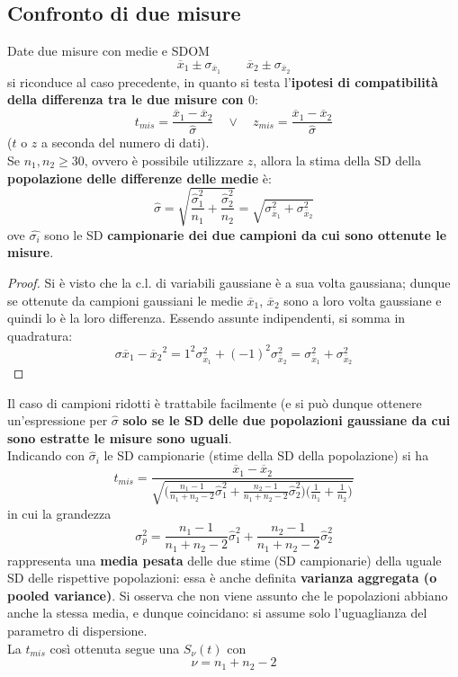 \documentclass[10pt, oneside]{book}
\begin{document}
\subsection{Confronto di due misure}
Date due misure con medie e SDOM
\[\overline{x}_1 \pm \sigma_{\overline{x}_1} \qquad \overline{x}_2 \pm \sigma_{\overline{x}_2}\]
si riconduce al caso precedente, in quanto si testa l'\textbf{ipotesi di compatibilità della differenza tra le due misure con $0$}:
\[t_{mis} = \frac{\overline{x}_1 - \overline{x}_2}{\hat{\sigma}} \quad \lor \quad z_{mis} = \frac{\overline{x}_1 - \overline{x}_2}{\hat{\sigma}}\]
($t$ o $z$ a seconda del numero di dati).\\
Se $n_1, n_2 \geq 30$, ovvero è possibile utilizzare $z$, allora la stima della SD della \textbf{popolazione delle differenze delle medie} è:
\[\hat{\sigma} = \sqrt{\frac{\hat{\sigma}_1^2}{n_1} + \frac{\hat{\sigma}_2^2}{n_2}} = \sqrt{\sigma_{\overline{x}_1}^2 + \sigma_{\overline{x}_2}^2}\]
ove $\hat{\sigma_i}$ sono le SD \textbf{campionarie dei due campioni da cui sono ottenute le misure}.
\begin{proof}
Si è visto che la c.l. di variabili gaussiane è a sua volta gaussiana; dunque se ottenute da campioni gaussiani le medie $\overline{x}_1$, $\overline{x}_2$ sono a loro volta gaussiane e quindi lo è la loro differenza. Essendo assunte indipendenti, si somma in quadratura:
\[\sigma{\overline{x}_1 - \overline{x}_2}^2 = 1^2 \sigma_{\overline{x}_1}^2 + (-1)^2 \sigma_{\overline{x}_2}^2 = \sigma_{\overline{x}_1}^2 + \sigma_{\overline{x}_2}^2\]
\end{proof}
Il caso di campioni ridotti è trattabile facilmente (e si può dunque ottenere un'espressione per $\hat{\sigma}$ \textbf{solo se le SD delle due popolazioni gaussiane da cui sono estratte le misure sono uguali}.\\Indicando con $\hat{\sigma}_i$ le SD campionarie (stime della SD della popolazione) si ha
\[t_{mis} = \frac{\overline{x}_1 - \overline{x}_2}{\displaystyle \sqrt{\bigg(\frac{n_1 - 1}{n_1 + n_2 - 2} \hat{\sigma}_1^2 + \frac{n_2 - 1}{n_1 + n_2 - 2}\hat{\sigma}_2^2 \bigg) \bigg(\frac{1}{n_1} + \frac{1}{n_2}\bigg)}}\]
in cui la grandezza 
\[\sigma_p^2 = \frac{n_1 - 1}{n_1 + n_2 - 2} \hat{\sigma}_1^2 + \frac{n_2 - 1}{n_1 + n_2 - 2}\hat{\sigma}_2^2\]
rappresenta una \textbf{media pesata} delle due stime (SD campionarie) della uguale SD delle rispettive popolazioni: essa è anche definita \textbf{varianza aggregata (o pooled variance)}. Si osserva che non viene assunto che le popolazioni abbiano anche la stessa media, e dunque coincidano: si assume solo l'uguaglianza del parametro di dispersione.\\
La $t_{mis}$ così ottenuta segue una $S_\nu(t)$ con
\[\nu = n_1 + n_2 - 2\]
\end{document}
